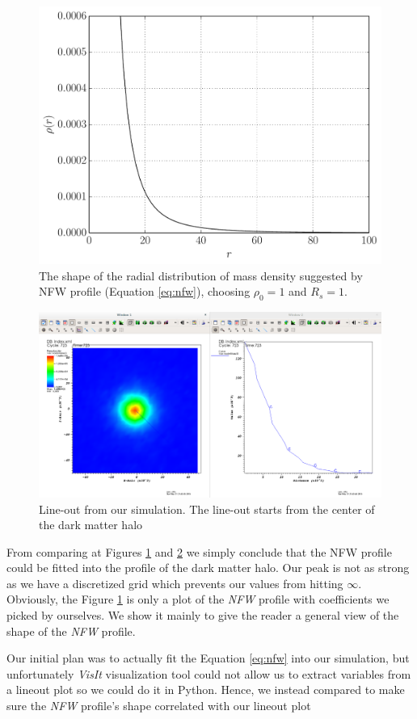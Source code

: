 \documentclass[notitlepage, 12pt]{article}
\begin{document}
\begin{figure}[H]
\centering
\includegraphics[width=.8\textwidth]{NFW_profile.pdf}
\caption{The shape of the radial distribution of mass density suggested by NFW profile (Equation \ref{eq:nfw}), choosing $\rho_0=1$ and $R_s=1$.}
\label{fig:nfw}
\end{figure}

\begin{figure}[H]
\centering
\includegraphics[width=.8\textwidth]{NFW-profile.png}
\caption{Line-out from our simulation. The line-out starts from the center of the dark matter halo}
\label{fig:simulationnfw}
\end{figure}

From comparing at Figures \ref{fig:nfw} and \ref{fig:simulationnfw} we simply conclude that the NFW profile could be fitted into the profile of the dark matter 
halo. Our peak is not as strong as we have a discretized grid which prevents our values from hitting $\infty$. Obviously, the Figure \ref{fig:nfw} is only 
a plot of the \emph{NFW} profile with coefficients we picked by ourselves. We show it mainly to give the reader a general view of the shape of the 
\emph{NFW} profile.

Our initial 
plan was to actually fit the Equation \ref{eq:nfw} into our simulation, but unfortunately \emph{VisIt} visualization tool could not allow us to 
extract variables from a lineout plot so we could do it in Python. Hence, we instead compared to make sure the \emph{NFW} profile's shape correlated 
with our lineout plot
\end{document}

